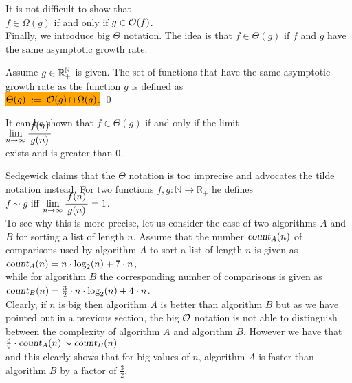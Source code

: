 It is not difficult to show that
\\[0.2cm]
\hspace*{1.3cm}
 $f \in \Omega(g)$ \quad if and only if \quad $g \in \mathcal{O}(f)$.
\\[0.2cm]
Finally, we introduce big $\Theta$ notation.  The idea is that $f \in \Theta(g)$ if 
$f$ and $g$ have the same asymptotic growth rate. 

\begin{Definition}[$\Theta(g)$]
  Assume $g \in {\mathbb R}_+^{{\mathbb N}}$ is given.   The set of functions that have the same asymptotic growth rate
  as the function $g$ is defined as
  \\[0.2cm]
  \hspace*{0.5cm} 
  \colorbox{orange}{
  $ \Theta(g) \;:=\; \mathcal{O}(g) \cap \Omega(g)$.}
  \qed 
\end{Definition}

\noindent
It can be shown that $f \in \Theta(g)$ if and only if the limit
\\[0.4cm]
\hspace*{1.3cm}
$\lim\limits_{n \rightarrow \infty} \bruch{f(n)}{g(n)}$
\\[0.2cm]
exists and is greater than $0$.
\vspace*{0.3cm}

Sedgewick \cite{sedgewick:11} claims that the $\Theta$ notation is too imprecise and advocates the
tilde notation instead.  For two functions $f,g : \mathbb{N} \rightarrow \mathbb{R}_+$ he defines
\\[0.3cm]
\hspace*{1.3cm}
$f \sim g$ \quad iff \quad $\lim\limits_{n \rightarrow \infty} \bruch{f(n)}{g(n)} = 1$.
\\[0.2cm]
To see why this is more precise, let us consider the case of two algorithms $A$ and $B$ for sorting a list of length
$n$.   Assume that the number $\textsl{count}_A(n)$ of comparisons used by algorithm $A$ to sort a list of
length $n$ is given as
\\[0.2cm]
\hspace*{1.3cm}
$\textsl{count}_A(n) = n \cdot \log_2(n) + 7 \cdot n$,
\\[0.2cm]
while for algorithm $B$ the corresponding number of comparisons is given as
\\[0.2cm]
\hspace*{1.3cm}
$\textsl{count}_B(n) = \frac{3}{2} \cdot n \cdot \log_2(n) + 4 \cdot n$.
\\[0.2cm]
Clearly, if $n$ is big then algorithm $A$ is better than algorithm $B$ but as we have pointed out in a previous
section, the big $\mathcal{O}$ notation is not able to distinguish between the complexity of algorithm $A$ and
algorithm $B$.  However we have that
\\[0.2cm]
\hspace*{1.3cm}
$\frac{3}{2} \cdot \textsl{count}_A(n) \sim \textsl{count}_B(n)$
\\[0.2cm]
and this clearly shows that for big values of $n$, algorithm $A$ is faster than algorithm $B$ by a
factor of $\frac{3}{2}$.



